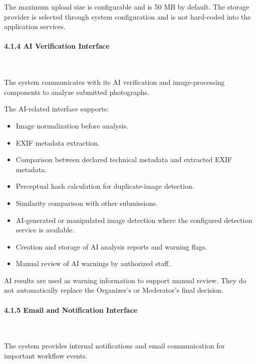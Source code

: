 The maximum upload size is configurable and is 50 MB by default. The storage provider is selected through system configuration and is not hard-coded into the application services.

\paragraph*{4.1.4 AI Verification Interface}\leavevmode\\[-0.5em]
\label{par:ai-verification-interface}

The system communicates with its AI verification and image-processing components to analyze submitted photographs.

The AI-related interface supports:

\begin{itemize}[leftmargin=1.5em, nosep]
    \item Image normalization before analysis.
    \item EXIF metadata extraction.
    \item Comparison between declared technical metadata and extracted EXIF metadata.
    \item Perceptual hash calculation for duplicate-image detection.
    \item Similarity comparison with other submissions.
    \item AI-generated or manipulated image detection where the configured detection service is available.
    \item Creation and storage of AI analysis reports and warning flags.
    \item Manual review of AI warnings by authorized staff.
\end{itemize}

AI results are used as warning information to support manual review. They do not automatically replace the Organizer's or Moderator's final decision.

\paragraph*{4.1.5 Email and Notification Interface}\leavevmode\\[-0.5em]
\label{par:email-notification-interface}

The system provides internal notifications and email communication for important workflow events.

